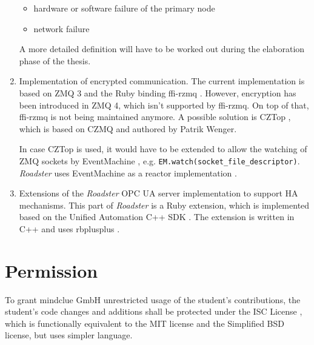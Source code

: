 \documentclass[a4paper]{article}
\newcommand{\rb}[1]{\lstinline[style=customruby]{#1}} %
\begin{document}
\begin{enumerate}
		\begin{itemize}
			\item hardware or software failure of the primary node
			\item network failure
		\end{itemize}

		A more detailed definition will have to be worked out during
		the elaboration phase of the thesis.

	\item Implementation of encrypted communication. The current
		implementation is based on ZMQ 3 and the Ruby binding ffi-rzmq
		\cite{github:ffi-rzmq}. However, encryption has been introduced
		in ZMQ 4, which isn't supported by ffi-rzmq. On top of that,
		ffi-rzmq is not being maintained anymore. A possible solution
		is CZTop \cite{github:cztop}, which is based on CZMQ
		\cite{czmq} and authored by Patrik Wenger.

		In case CZTop is used, it would have to be extended to allow
		the watching of ZMQ sockets by EventMachine
		\cite{gem:eventmachine}, e.g.
		\rb{EM.watch(socket_file_descriptor)}. \emph{Roadster} uses
		EventMachine as a reactor implementation
		\cite{wiki:reactor-pattern}.

	\item Extensions of the \emph{Roadster} OPC UA server implementation to
		support HA mechanisms. This part of \emph{Roadster} is a Ruby
		extension, which is implemented based on the Unified Automation
		C++ SDK \cite{ua-server-sdk}. The extension is written in C++
		and uses rbplusplus \cite{github:rbplusplus}.
\end{enumerate}

\section{Permission}
To grant mindclue GmbH unrestricted usage of the student's contributions, the
student's code changes and additions shall be protected under the ISC License
\cite{wiki:isc-license}, which is functionally equivalent to the MIT license
and the Simplified BSD license, but uses simpler language.

\printbibliography
\end{document}
